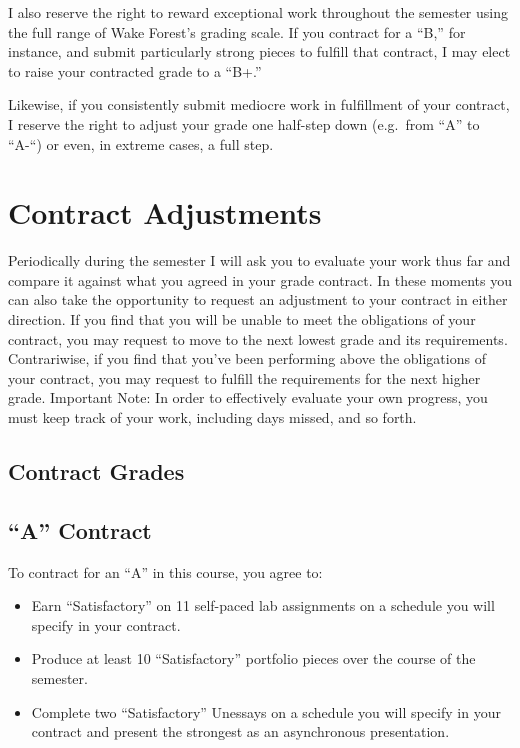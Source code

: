 I also reserve the right to reward exceptional work throughout the semester using the full range of Wake Forest's grading scale. If you contract for a ``B,'' for instance, and submit particularly strong pieces to fulfill that contract, I may elect to raise your contracted grade to a ``B+.''

Likewise, if you consistently submit mediocre work in fulfillment of your contract, I reserve the right to adjust your grade one half-step down (e.g.~from ``A'' to ``A-``) or even, in extreme cases, a full step.

\hypertarget{contract-adjustments}{%
\section*{Contract Adjustments}\label{contract-adjustments}}


Periodically during the semester I will ask you to evaluate your work thus far and compare it against what you agreed in your grade contract. In these moments you can also take the opportunity to request an adjustment to your contract in either direction. If you find that you will be unable to meet the obligations of your contract, you may request to move to the next lowest grade and its requirements. Contrariwise, if you find that you've been performing above the obligations of your contract, you may request to fulfill the requirements for the next higher grade. Important Note: In order to effectively evaluate your own progress, you must keep track of your work, including days missed, and so forth.

\hypertarget{contract-grades}{%
\subsection*{Contract Grades}\label{contract-grades}}


\hypertarget{a-contract}{%
\subsection*{``A'' Contract}\label{a-contract}}


To contract for an ``A'' in this course, you agree to:

\begin{itemize}
\item
  Earn ``Satisfactory'' on 11 self-paced lab assignments on a schedule you will specify in your contract.
\item
  Produce at least 10 ``Satisfactory'' portfolio pieces over the course of the semester.
\item
  Complete two ``Satisfactory'' Unessays on a schedule you will specify in your contract and present the strongest as an asynchronous presentation.
\end{itemize}

